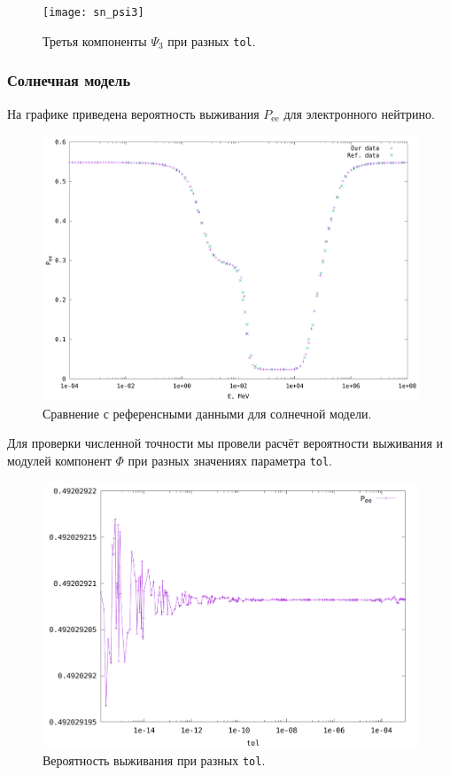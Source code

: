 \documentclass[12pt]{article}
\begin{document}
\begin{figure}[htb]
  \hspace*{-2em}
  \texttt{[image: sn\_psi3]}
  \caption{\label{fig:7}Третья компоненты \(\Psi_{3}\) при разных \texttt{tol}.}
\end{figure}

\subsubsection*{Солнечная модель}

На графике приведена вероятность выживания \(P_{\text{ee}}\) для электронного
нейтрино.
\begin{figure}[htb]
  \hspace*{-2em}
  \includegraphics[scale=0.6]{sun_our_vs_ref}
  \caption{\label{fig:2}Сравнение с референсными данными для солнечной модели.}
\end{figure}

Для проверки численной точности мы провели расчёт вероятности выживания и
модулей компонент \(\Phi\) при разных значениях параметра \verb|tol|.

\begin{figure}[htb]
  \hspace*{-2em}
  \includegraphics[scale=0.5]{sun_Pee}
  \caption{\label{fig:8}Вероятность выживания при разных \texttt{tol}.}
\end{figure}
\end{document}
